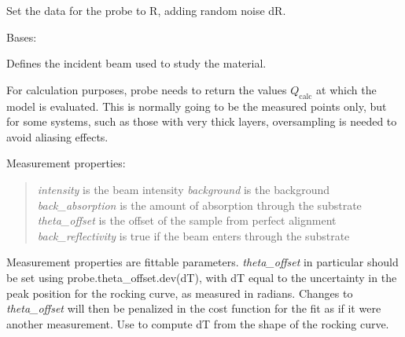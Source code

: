 \documentclass[letterpaper,10pt,english]{sphinxmanual}
\begin{document}
\begin{fulllineitems}
\begin{fulllineitems}
\end{fulllineitems}


\begin{fulllineitems}
\label{api/probe:refl1d.probe.PolarizedNeutronQProbe.simulate_data}
Set the data for the probe to R, adding random noise dR.

\end{fulllineitems}


\end{fulllineitems}


\begin{fulllineitems}
\label{api/probe:refl1d.probe.Probe}
Bases: 

Defines the incident beam used to study the material.

For calculation purposes, probe needs to return the values $Q_\text{calc}$
at which the model is evaluated.  This is normally going to be the measured
points only, but for some systems, such as those with very thick layers,
oversampling is needed to avoid aliasing effects.

Measurement properties:
\begin{quote}

\emph{intensity} is the beam intensity
\emph{background} is the background
\emph{back\_absorption} is the amount of absorption through the substrate
\emph{theta\_offset} is the offset of the sample from perfect alignment
\emph{back\_reflectivity} is true if the beam enters through the substrate
\end{quote}

Measurement properties are fittable parameters.  \emph{theta\_offset} in
particular should be set using probe.theta\_offset.dev(dT), with dT
equal to the uncertainty in the peak position for the rocking curve,
as measured in radians.  Changes to \emph{theta\_offset} will then be penalized
in the cost function for the fit as if it were another measurement.  Use
{\hyperref[api/probe:refl1d.probe.Probe.alignment_uncertainty]{}} to compute dT from the shape of the
rocking curve.


\end{fulllineitems}
\end{document}
